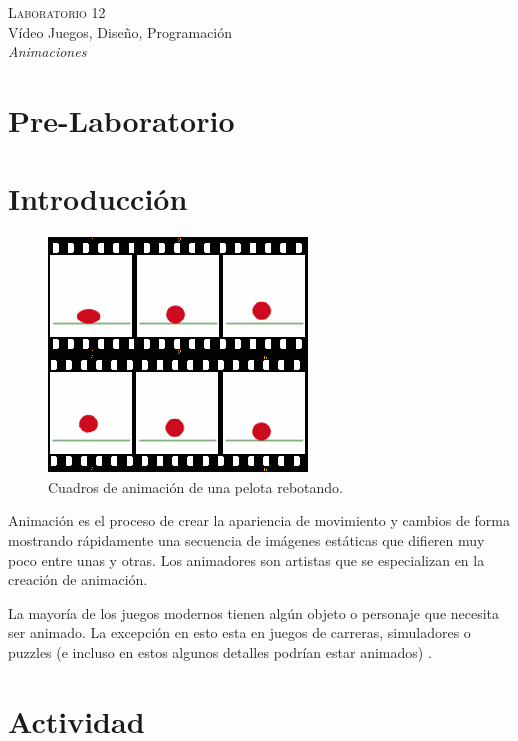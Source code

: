 \begin{center}
\textsc{\Large Laboratorio 12}~\\
{\large Vídeo Juegos, Diseño, Programación}~\\
\emph{Animaciones}
\end{center}

\section{Pre-Laboratorio}

\section{Introducción}
\setlength\intextsep{0pt}
\begin{figure}
\includegraphics[width=\linewidth]{media/anim_frames.png}
\caption{Cuadros de animación de una pelota rebotando.}
\label{fig:particles}
\end{figure}
Animación es el proceso de crear la apariencia de movimiento y cambios de forma mostrando rápidamente una secuencia de imágenes estáticas que difieren muy poco entre unas y otras. Los animadores son artistas que se especializan en la creación de animación.

La mayoría de los juegos modernos tienen algún objeto o personaje que necesita ser animado. La excepción en esto esta en juegos de carreras, simuladores o puzzles (e incluso en estos algunos detalles podrían estar animados) \cite[p.~381]{erikgamedevelopment}.
\section{Actividad}
